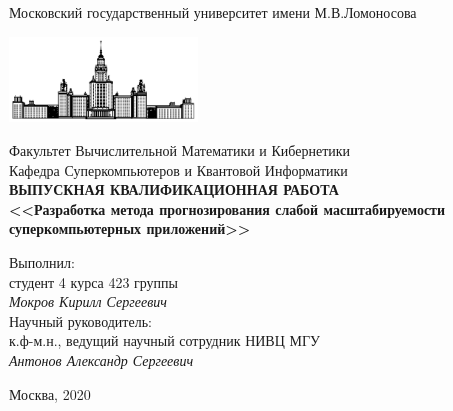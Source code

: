 \begin{titlepage}
	\begin{center}
	    Московский государственный университет имени М.В.Ломоносова

	    \bigskip
	    \includegraphics[width=50mm]{./images/MSU}

	    \bigskip
	    Факультет Вычислительной Математики и Кибернетики\\
	    Кафедра Суперкомпьютеров и Квантовой Информатики\\[10mm]

	    \textsf{\large\bfseries
	        ВЫПУСКНАЯ КВАЛИФИКАЦИОННАЯ РАБОТА\\[10mm]
	        <<Разработка метода прогнозирования слабой масштабируемости суперкомпьютерных приложений>>
	    }\\[10mm]

	    \begin{flushright}
	        \parbox{0.5\textwidth}{
	            Выполнил:\\
	            студент 4 курса 423 группы\\
	            \emph{Мокров Кирилл Сергеевич}\\[5mm]
	            Научный руководитель:\\
	            к.ф-м.н., ведущий научный сотрудник НИВЦ МГУ\\
	            \emph{Антонов Александр Сергеевич}
	        }
	    \end{flushright}

	    \vspace{\fill}
	    Москва, 2020
	\end{center}
\end{titlepage}

\clearpage
